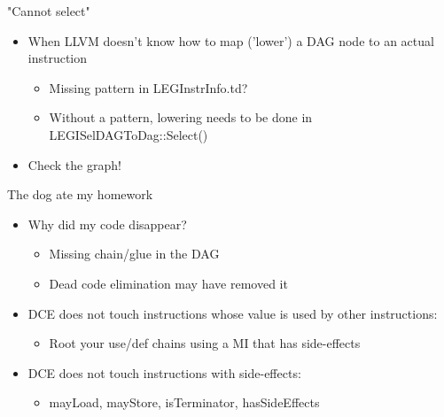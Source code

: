 
\begin{frame}{"Cannot select"}

\begin{itemize}
    \item When LLVM doesn't know how to map ('lower') a DAG node to an actual instruction
    \begin{itemize}
        \item Missing pattern in LEGInstrInfo.td?
        \item Without a pattern, lowering needs to be done in LEGISelDAGToDag::Select()
    \end{itemize}
    \item Check the graph!
\end{itemize}

\end{frame}


\begin{frame}{The dog ate my homework}

\begin{itemize}
    \item Why did my code disappear?
    \begin{itemize}
        \item Missing chain/glue in the DAG
        \item Dead code elimination may have removed it
    \end{itemize}
    \item DCE does not touch instructions whose value is used by other instructions:
    \begin{itemize}
        \item Root your use/def chains using a MI that has side-effects
    \end{itemize}
    \item DCE does not touch instructions with side-effects:
    \begin{itemize}
        \item mayLoad, mayStore, isTerminator, hasSideEffects
    \end{itemize}
\end{itemize}

\end{frame}


